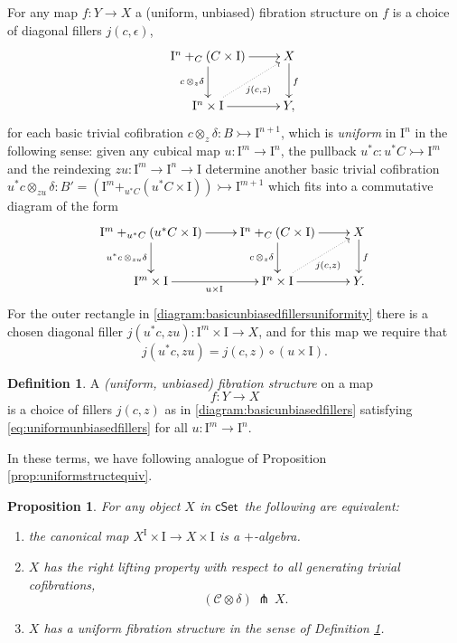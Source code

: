 \documentclass[11pt]{article}
\newcommand{\cSet}{\ensuremath{\mathsf{cSet}}}
\newcommand{\mono}{\ensuremath{\rightarrowtail}}
\newcommand{\I}{\ensuremath{\mathrm{I}}}
\newtheorem{proposition}[theorem]{Proposition}
\theoremstyle{remark}
\theoremstyle{definition}
\newtheorem{definition}[theorem]{Definition}
\begin{document}
For any map $f:Y\to X$  a (uniform, unbiased) fibration structure on $f$ is a choice of diagonal fillers $j(c,\epsilon)$,
\begin{equation}\label{diagram:basicunbiasedfillers}
\xymatrix{
\I^n +_C (C\times\I) \ar[d]_{c\,\otimes_z\delta} \ar[r] & X \ar[d]^f \\
\I^{n}\times \I \ar@{.>}[ru]_{j(c,z)} \ar[r] & Y,
}
\end{equation}
for each basic trivial cofibration $c \otimes_z \delta : B \mono \I^{n+1}$, which is \emph{uniform} in $\I^n$ in the following sense: given any cubical map $u : \I^m \to \I^n$, the pullback $u^*c : u^*C\mono \I^m$ and the reindexing $zu : \I^m \to \I^n\to\I$ determine another basic trivial cofibration $u^*c \otimes_{zu} \delta : B' = (\I^m +_{u^*C} (u^*C\times\I)) \mono \I^{m+1}$ which fits into a commutative diagram of the form
\begin{equation}\label{diagram:basicunbiasedfillersuniformity}
\xymatrix{
\I^m +_{u^*C} (u^*C\times\I) \ar[d]_{u^*c\,\otimes_{zu}\delta} \ar[r] & \I^n +_C (C\times\I) \ar[d]_{c\,\otimes_z\delta} \ar[r] & X \ar[d]^f \\
\I^{m}\times \I  \ar[r]_{u\times \I} & \I^{n}\times \I \ar@{.>}[ru]_{j(c,z)} \ar[r] & Y.
}
\end{equation}
For the outer rectangle in \eqref{diagram:basicunbiasedfillersuniformity} there is a chosen diagonal filler $j(u^*c,zu): \I^m\times\I\to X$, and for this map we require that
\begin{equation}\label{eq:uniformunbiasedfillers}
j(u^*c,zu) = j(c,z)\circ (u\times \I).
\end{equation}

\begin{definition}\label{def:unbiasedfibstructure} A \emph{(uniform, unbiased) fibration structure} on a map $$f: Y\to X$$ is a choice of fillers $j(c,z)$ as in \eqref{diagram:basicunbiasedfillers} satisfying \eqref{eq:uniformunbiasedfillers} for all $u : \I^m\to\I^n$.
\end{definition}

In these terms, we have following analogue of Proposition \ref{prop:uniformstructequiv}.

\begin{proposition}\label{prop:equivfibrstruc} For any object $X$ in \cSet\ the following are equivalent:
\begin{enumerate}
\item the canonical map $X^\I\times \I \to X\times \I$ is a \emph{$+$-algebra}.

\item $X$ has the right lifting property with respect to all generating trivial cofibrations,
\[
(\mathcal{C}\otimes\delta)\, \pitchfork\,X.
\]

\item $X$ has a \emph{uniform fibration structure} in the sense of Definition \ref{def:unbiasedfibstructure}.
\end{enumerate}
\end{proposition}
\end{document}
